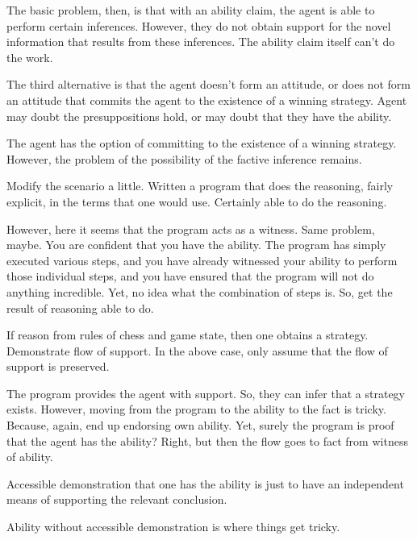 \documentclass[10pt]{article}
\begin{document}
The basic problem, then, is that with an ability claim, the agent is able to perform certain inferences.
However, they do not obtain support for the novel information that results from these inferences.
The ability claim itself can't do the work.

\begin{note}
  The third alternative is that the agent doesn't form an attitude, or does not form an attitude that commits the agent to the existence of a winning strategy.
  Agent may doubt the presuppositions hold, or may doubt that they have the ability.

  The agent has the option of committing to the existence of a winning strategy.
  However, the problem of the possibility of the factive inference remains.
\end{note}

\begin{note}
  Modify the scenario a little.
  Written a program that does the reasoning, fairly explicit, in the terms that one would use.
  Certainly able to do the reasoning.

  However, here it seems that the program acts as a witness.
  Same problem, maybe.
  You are confident that you have the ability.
  The program has simply executed various steps, and you have already witnessed your ability to perform those individual steps, and you have ensured that the program will not do anything incredible.
  Yet, no idea what the combination of steps is.
  So, get the result of reasoning able to do.

  If reason from rules of chess and game state, then one obtains a strategy.
  Demonstrate flow of support.
  In the above case, only assume that the flow of support is preserved.

  The program provides the agent with support.
  So, they can infer that a strategy exists.
  However, moving from the program to the ability to the fact is tricky.
  Because, again, end up endorsing own ability.
  Yet, surely the program is proof that the agent has the ability?
  Right, but then the flow goes to fact from witness of ability.

  Accessible demonstration that one has the ability is just to have an independent means of supporting the relevant conclusion.

  Ability without accessible demonstration is where things get tricky.
\end{note}
\end{document}
